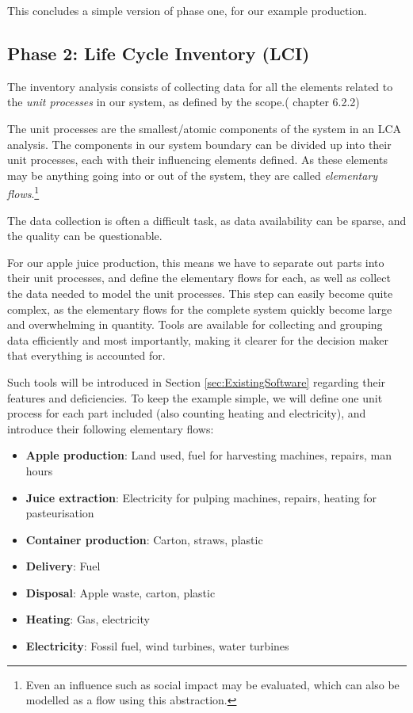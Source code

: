 This concludes a simple version of phase one, for our example production.

\subsection{Phase 2: Life Cycle Inventory (LCI)} \label{ssec:Phase2}
The inventory analysis consists of collecting data for all the elements related to the \emph{unit processes} in our system, as defined by the scope.(\cite{LCA_TheoryAndPractice} chapter 6.2.2) 

The unit processes are the smallest/atomic components of the system in an LCA analysis. The components in our system boundary can be divided up into their unit processes, each with their influencing elements defined. As these elements may be anything going into or out of the system, they are called \emph{elementary flows}.\footnote{Even an influence such as social impact may be evaluated, which can also be modelled as a flow using this abstraction.} 

The data collection is often a difficult task, as data availability can be sparse, and the quality can be questionable. 
 
\vspace{1cm}
For our apple juice production, this means we have to separate out parts into their unit processes, and define the elementary flows for each, as well as collect the data needed to model the unit processes. This step can easily become quite complex, as the elementary flows for the complete system quickly become large and overwhelming in quantity. Tools are available for collecting and grouping data efficiently and most importantly, making it clearer for the decision maker that everything is accounted for.

Such tools will be introduced in Section \ref{sec:ExistingSoftware} regarding their features and deficiencies. To keep the example simple, we will define one unit process for each part included (also counting heating and electricity), and introduce their following elementary flows:

\begin{itemize}
    \item \textbf{Apple production}: Land used, fuel for harvesting machines, repairs, man hours
    \item \textbf{Juice extraction}: Electricity for pulping machines, repairs, heating for pasteurisation
    \item \textbf{Container production}: Carton, straws, plastic
    \item \textbf{Delivery}: Fuel
    \item \textbf{Disposal}: Apple waste, carton, plastic
    \item \textbf{Heating}: Gas, electricity
    \item \textbf{Electricity}: Fossil fuel, wind turbines, water turbines
\end{itemize}

